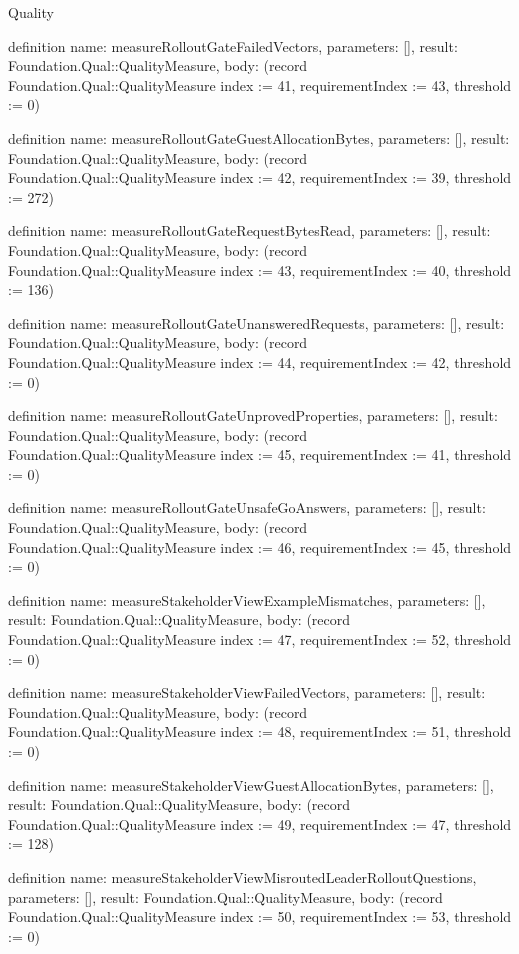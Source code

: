 \begin{lexlean}{Quality}
\begin{semanticmodule}
definition{
  name: measureRolloutGateFailedVectors,
  parameters: [],
  result: Foundation.Qual::QualityMeasure,
  body: (record Foundation.Qual::QualityMeasure {index := 41, requirementIndex := 43, threshold := 0})
}

definition{
  name: measureRolloutGateGuestAllocationBytes,
  parameters: [],
  result: Foundation.Qual::QualityMeasure,
  body: (record Foundation.Qual::QualityMeasure {index := 42, requirementIndex := 39, threshold := 272})
}

definition{
  name: measureRolloutGateRequestBytesRead,
  parameters: [],
  result: Foundation.Qual::QualityMeasure,
  body: (record Foundation.Qual::QualityMeasure {index := 43, requirementIndex := 40, threshold := 136})
}

definition{
  name: measureRolloutGateUnansweredRequests,
  parameters: [],
  result: Foundation.Qual::QualityMeasure,
  body: (record Foundation.Qual::QualityMeasure {index := 44, requirementIndex := 42, threshold := 0})
}

definition{
  name: measureRolloutGateUnprovedProperties,
  parameters: [],
  result: Foundation.Qual::QualityMeasure,
  body: (record Foundation.Qual::QualityMeasure {index := 45, requirementIndex := 41, threshold := 0})
}

definition{
  name: measureRolloutGateUnsafeGoAnswers,
  parameters: [],
  result: Foundation.Qual::QualityMeasure,
  body: (record Foundation.Qual::QualityMeasure {index := 46, requirementIndex := 45, threshold := 0})
}

definition{
  name: measureStakeholderViewExampleMismatches,
  parameters: [],
  result: Foundation.Qual::QualityMeasure,
  body: (record Foundation.Qual::QualityMeasure {index := 47, requirementIndex := 52, threshold := 0})
}

definition{
  name: measureStakeholderViewFailedVectors,
  parameters: [],
  result: Foundation.Qual::QualityMeasure,
  body: (record Foundation.Qual::QualityMeasure {index := 48, requirementIndex := 51, threshold := 0})
}

definition{
  name: measureStakeholderViewGuestAllocationBytes,
  parameters: [],
  result: Foundation.Qual::QualityMeasure,
  body: (record Foundation.Qual::QualityMeasure {index := 49, requirementIndex := 47, threshold := 128})
}

definition{
  name: measureStakeholderViewMisroutedLeaderRolloutQuestions,
  parameters: [],
  result: Foundation.Qual::QualityMeasure,
  body: (record Foundation.Qual::QualityMeasure {index := 50, requirementIndex := 53, threshold := 0})
}


\end{semanticmodule}
\end{lexlean}
